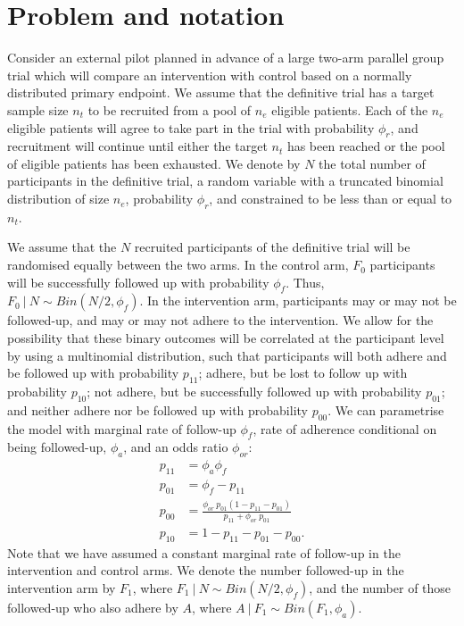 \documentclass{article}
\begin{document}

\section{Problem and notation}\label{sec:problem}

Consider an external pilot planned in advance of a large two-arm parallel group trial which will compare an intervention with control based on a normally distributed primary endpoint. We assume that the definitive trial has a target sample size $n_t$ to be recruited from a pool of $n_e$ eligible patients. Each of the $n_e$ eligible patients will agree to take part in the trial with probability $\phi_r$, and recruitment will continue until either the target $n_t$ has been reached or the pool of eligible patients has been exhausted. We denote by $N$ the total number of participants in the definitive trial, a random variable with a truncated binomial distribution of size $n_e$, probability $\phi_r$, and constrained to be less than or equal to $n_t$.

We assume that the $N$ recruited participants of the definitive trial will be randomised equally between the two arms. In the control arm, $F_0$ participants will be successfully followed up with probability $\phi_f$. Thus, $F_0 ~|~ N \sim Bin(N/2, \phi_f)$. In the intervention arm, participants may or may not be followed-up, and may or may not adhere to the intervention. We allow for the possibility that these binary outcomes will be correlated at the participant level by using a multinomial distribution, such that participants will both adhere and be followed up with probability $p_{11}$; adhere, but be lost to follow up with probability $p_{10}$; not adhere, but be successfully followed up with probability $p_{01}$; and neither adhere nor be followed up with probability $p_{00}$. We can parametrise the model with marginal rate of follow-up $\phi_f$, rate of adherence conditional on being followed-up, $\phi_a$, and an odds ratio $\phi_{or}$:
\begin{align*}
p_{11} &= \phi_a \phi_f \\
p_{01} &= \phi_f - p_{11} \\
p_{00} &= \frac{\phi_{or} ~ p_{01}(1-p_{11}-p_{01})}{p_{11} + \phi_{or} ~ p_{01}} \\
p_{10} &= 1 - p_{11} - p_{01} - p_{00}.
\end{align*}
Note that we have assumed a constant marginal rate of follow-up in the intervention and control arms. We denote the number followed-up in the intervention arm by $F_1$, where $F_1 ~|~ N\sim Bin(N/2, \phi_f)$, and the number of those followed-up who also adhere by $A$, where $A ~|~ F_1 \sim Bin(F_1, \phi_a)$. 
\end{document}
